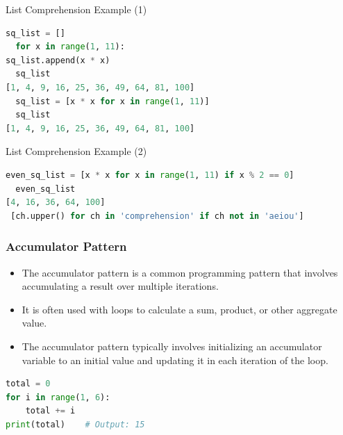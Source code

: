 \begin{frame}[fragile]{List Comprehension Example (1)}
    \begin{lstlisting}[language=Python]
  sq_list = []
  for x in range(1, 11):
sq_list.append(x * x)
  sq_list
[1, 4, 9, 16, 25, 36, 49, 64, 81, 100]
  sq_list = [x * x for x in range(1, 11)]
  sq_list
[1, 4, 9, 16, 25, 36, 49, 64, 81, 100]
    \end{lstlisting}
\end{frame}

\begin{frame}[fragile]{List Comprehension Example (2)}
    \begin{lstlisting}[language=Python]
  even_sq_list = [x * x for x in range(1, 11) if x % 2 == 0]
  even_sq_list
[4, 16, 36, 64, 100]
 [ch.upper() for ch in 'comprehension' if ch not in 'aeiou']
    \end{lstlisting}
\end{frame}

\begin{frame}[fragile]
\frametitle{Accumulator Pattern}
\begin{itemize}
    \item The accumulator pattern is a common programming pattern that involves accumulating a result over multiple iterations.
    \item It is often used with loops to calculate a sum, product, or other aggregate value.
    \item The accumulator pattern typically involves initializing an accumulator variable to an initial value and updating it in each iteration of the loop.
\end{itemize}
 \begin{lstlisting}[language=Python]
total = 0
for i in range(1, 6):
    total += i
print(total)    # Output: 15            
\end{lstlisting}
\end{frame}


